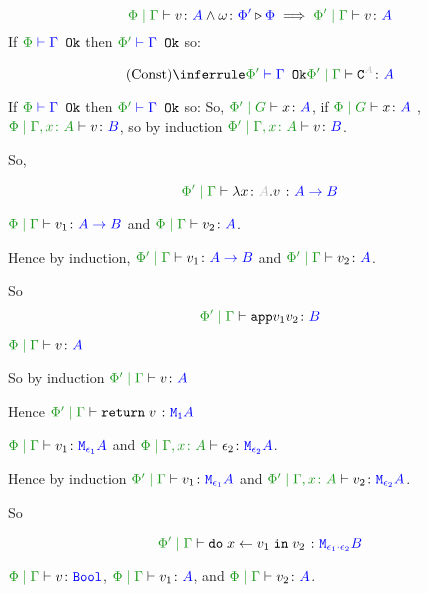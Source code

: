 \documentclass{report}
\begin{document}
    \begin{equation}
        \gpetyperelation{v}{A} \wedge \wrelw{\P'}{\P} \implies \etyperelation{\P'}{\G}{v}{A}
    \end{equation}
    \proof
    If $\wellformedok{\P}{\G}$ then $\wellformedok{\P'}{\G}$ so:

    \begin{equation}
        \ntreeruleI{Const}{\wellformedok{\P'}{\G}}{\etyperelation{\P'}{\G}{\const{A}}{A}}
    \end{equation}

    If $\wellformedok{\P}{\G}$ then $\wellformedok{\P'}{\G}$ so:
    So, $\etyperelation{\P'}{G}{x}{A}$, if $\etyperelation{\P}{G}{x}{A}$
    \bi, $\etyperelation{\P}{\gax}{v}{B}$, so by induction $\etyperelation{\P'}{\gax}{v}{B}$.

    So,

    \begin{equation}
        \etyperelation{\P'}{\G}{\lam{x}{A}{v}}{\ab}
    \end{equation}

    \bi $\gpetyperelation{v_1}{\ab}$ and $\gpetyperelation{v_2}{A}$.

    Hence by induction,
    $\gppetyperelation{v_1}{\ab}$ and $\gppetyperelation{v_2}{A}$.

    So $$\gppetyperelation{\app{v_1}{v_2}}{B}$$


    \bi $\gpetyperelation{v}{A}$ 
    
    So by induction $\gppetyperelation{v}{A}$

    Hence $\gppetyperelation{\return{v}}{\moa}$


    \bi $\gpetyperelation{v_1}{\M{\e_1}{A}}$ and $\etyperelation{\P}{\gax}{\e_2}{\M{\e_2}{A}}$.

    Hence by induction $\gppetyperelation{v_1}{\M{\e_1}{A}}$ and $\etyperelation{\P'}{\gax}{v_2}{\M{\e_2}{A}}$.

    So

    \begin{equation}
        \gppetyperelation{\doin{x}{v_1}{v_2}}{\M{\e_1\dot\e_2}{B}}
    \end{equation}


    \bi $\gpetyperelation{v}{\B}$, $\gpetyperelation{v_1}{A}$, and $\gpetyperelation{v_2}{A}$.
\end{document}
